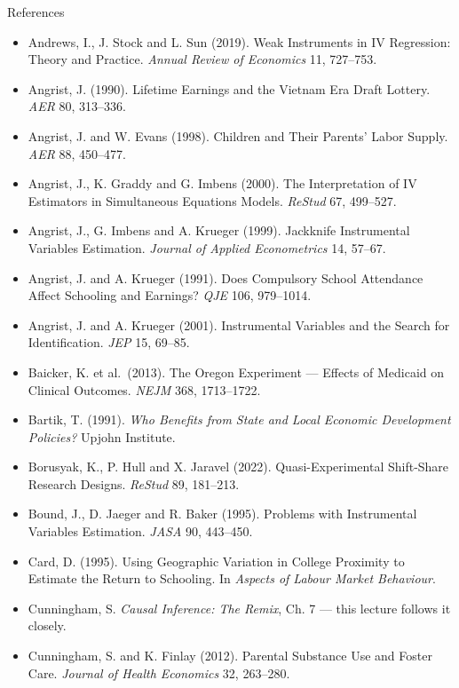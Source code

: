 \documentclass[
  11pt,
  ignorenonframetext,
  aspectratio=169,
]{beamer}
\providecommand{\tightlist}{%
  \setlength{\itemsep}{0pt}\setlength{\parskip}{0pt}}
\begin{document}
\begin{frame}{References}
\protect{}\label{references}
\tiny

\begin{itemize}
\tightlist
\item
  Andrews, I., J. Stock and L. Sun (2019). Weak Instruments in IV
  Regression: Theory and Practice. \emph{Annual Review of Economics} 11,
  727--753.
\item
  Angrist, J. (1990). Lifetime Earnings and the Vietnam Era Draft
  Lottery. \emph{AER} 80, 313--336.
\item
  Angrist, J. and W. Evans (1998). Children and Their Parents' Labor
  Supply. \emph{AER} 88, 450--477.
\item
  Angrist, J., K. Graddy and G. Imbens (2000). The Interpretation of IV
  Estimators in Simultaneous Equations Models. \emph{ReStud} 67,
  499--527.
\item
  Angrist, J., G. Imbens and A. Krueger (1999). Jackknife Instrumental
  Variables Estimation. \emph{Journal of Applied Econometrics} 14,
  57--67.
\item
  Angrist, J. and A. Krueger (1991). Does Compulsory School Attendance
  Affect Schooling and Earnings? \emph{QJE} 106, 979--1014.
\item
  Angrist, J. and A. Krueger (2001). Instrumental Variables and the
  Search for Identification. \emph{JEP} 15, 69--85.
\item
  Baicker, K. et al.~(2013). The Oregon Experiment --- Effects of
  Medicaid on Clinical Outcomes. \emph{NEJM} 368, 1713--1722.
\item
  Bartik, T. (1991). \emph{Who Benefits from State and Local Economic
  Development Policies?} Upjohn Institute.
\item
  Borusyak, K., P. Hull and X. Jaravel (2022). Quasi-Experimental
  Shift-Share Research Designs. \emph{ReStud} 89, 181--213.
\item
  Bound, J., D. Jaeger and R. Baker (1995). Problems with Instrumental
  Variables Estimation. \emph{JASA} 90, 443--450.
\item
  Card, D. (1995). Using Geographic Variation in College Proximity to
  Estimate the Return to Schooling. In \emph{Aspects of Labour Market
  Behaviour}.
\item
  Cunningham, S. \emph{Causal Inference: The Remix}, Ch. 7 --- this
  lecture follows it closely.
\item
  Cunningham, S. and K. Finlay (2012). Parental Substance Use and Foster
  Care. \emph{Journal of Health Economics} 32, 263--280.

\end{itemize}
\end{frame}
\end{document}

